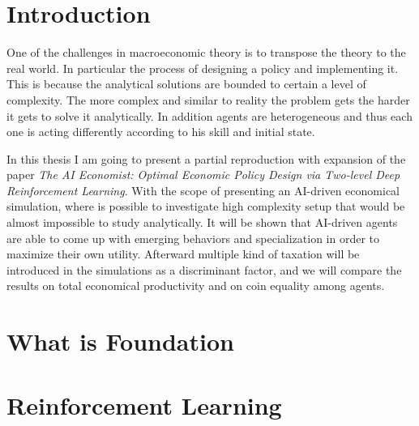 \documentclass[12pt,a4paper,openright,twoside]{report}
\numberwithin{equation}{section}
\begin{document}
\chapter*{Introduction}             

One of the challenges in macroeconomic theory is to transpose the theory to the real world. In particular the process of designing a policy and implementing it. This is because the analytical solutions are bounded to certain a level of complexity. The more complex and similar to reality the problem gets the harder it gets to solve it analytically. In addition agents are heterogeneous and thus each one is acting differently according to his skill and initial state. 


In this thesis I am going to present a partial reproduction with expansion of the paper \textit{The AI Economist: Optimal Economic Policy Design via Two-level Deep Reinforcement Learning}\cite{zheng2021ai}. With the scope of presenting an AI-driven economical simulation, where is possible to investigate high complexity setup that would be almost impossible to study analytically. It will be shown that AI-driven agents are able to come up with emerging behaviors and specialization in order to maximize their own utility. Afterward multiple kind of taxation will be introduced in the simulations as a discriminant factor, and we will compare the results on total economical productivity and on coin equality among agents.



\chapter{What is Foundation}




\chapter{Reinforcement Learning}
 
\end{document}
